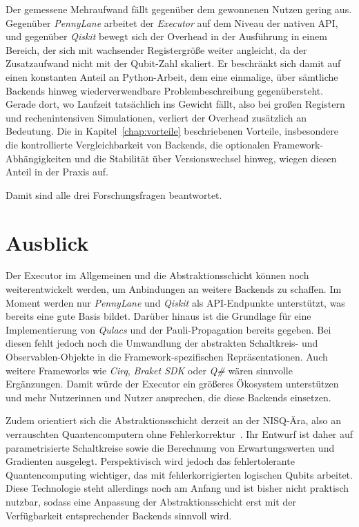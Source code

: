 Der gemessene Mehraufwand fällt gegenüber dem gewonnenen Nutzen gering aus.
Gegenüber \textit{PennyLane} arbeitet der \textit{Executor} auf dem Niveau der
nativen API, und gegenüber \textit{Qiskit} bewegt sich der Overhead in der
Ausführung in einem Bereich, der sich mit wachsender Registergröße weiter
angleicht, da der Zusatzaufwand nicht mit der Qubit-Zahl skaliert. Er beschränkt
sich damit auf einen konstanten Anteil an Python-Arbeit, dem eine einmalige, über
sämtliche Backends hinweg wiederverwendbare Problembeschreibung gegenübersteht.
Gerade dort, wo Laufzeit tatsächlich ins Gewicht fällt, also bei großen Registern
und rechenintensiven Simulationen, verliert der Overhead zusätzlich an Bedeutung.
Die in Kapitel~\ref{chap:vorteile} beschriebenen Vorteile, insbesondere die
kontrollierte Vergleichbarkeit von Backends, die optionalen
Framework-Abhängigkeiten und die Stabilität über Versionswechsel hinweg, wiegen
diesen Anteil in der Praxis auf.

Damit sind alle drei Forschungsfragen beantwortet.
\newpage
\section{Ausblick}
\label{sec:ausblick}
Der Executor im Allgemeinen und die Abstraktionsschicht können noch
weiterentwickelt werden, um Anbindungen an weitere Backends zu schaffen. Im
Moment werden nur \textit{PennyLane} und \textit{Qiskit} als API-Endpunkte
unterstützt, was bereits eine gute Basis bildet. Darüber hinaus ist die Grundlage
für eine Implementierung von \textit{Qulacs} und der Pauli-Propagation bereits
gegeben. Bei diesen fehlt jedoch noch die Umwandlung der abstrakten Schaltkreis-
und Observablen-Objekte in die Framework-spezifischen Repräsentationen. Auch
weitere Frameworks wie \textit{Cirq}, \textit{Braket SDK} oder \textit{Q\#} wären
sinnvolle Ergänzungen. Damit würde der Executor ein größeres Ökosystem
unterstützen und mehr Nutzerinnen und Nutzer ansprechen, die diese Backends
einsetzen.

Zudem orientiert sich die Abstraktionsschicht derzeit an der NISQ-Ära, also an verrauschten Quantencomputern ohne Fehlerkorrektur~\cite{preskill2018quantum}. Ihr Entwurf ist daher auf parametrisierte Schaltkreise sowie die Berechnung von Erwartungswerten und Gradienten ausgelegt. Perspektivisch wird jedoch das fehlertolerante Quantencomputing wichtiger, das mit fehlerkorrigierten logischen Qubits arbeitet. Diese Technologie steht allerdings noch am Anfang und ist bisher nicht praktisch nutzbar, sodass eine Anpassung der Abstraktionsschicht erst mit der Verfügbarkeit entsprechender Backends sinnvoll wird.

